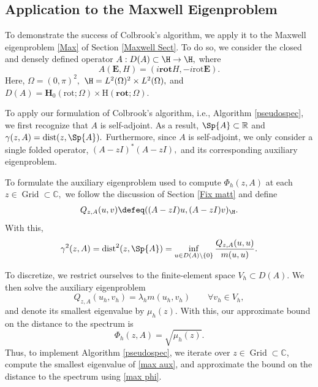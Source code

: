 \subsection{Application to the Maxwell Eigenproblem} \label{Matt Max}

To demonstrate the success of Colbrook's algorithm, we apply it to the Maxwell eigenproblem \eqref{Max} of Section \ref{Maxwell Sect}. To do so, we consider the closed and densely defined operator $A: D(A) \subset \H \rightarrow \H,$ where
\begin{equation} \label{max op}
    A(\mathbf{E}, H) = (i \textbf{rot} H, - i \text{rot} \mathbf{E}).
\end{equation}
Here, $\Omega = (0, \pi)^2,$ $\H = L^2(\Omega)^2 \times L^2(\Omega),$ and $D(A) = \mathbf{H}_0(\text{rot} ; \Omega) \times \text{H}(\textbf{rot};\Omega).$


To apply our formulation of Colbrook's algorithm, i.e., Algorithm \ref{pseudospec}, we first recognize that $A$ is self-adjoint. As a result, $\Sp{A} \subset \mathbb{R}$ and $\gamma(z, A) = \operatorname{dist}(z, \Sp{A}).$ Furthermore, since $A$ is self-adjoint, we only consider a single folded operator, $(A-zI)^*(A-zI),$ and its corresponding auxiliary eigenproblem.

To formulate the auxiliary eigenproblem used to compute $\Phi_h(z, A)$ at each $z \in \operatorname{Grid} \subset \mathbb{C},$ we follow the discussion of Section \ref{Fix matt} and define
\begin{align}
    Q_{z, A}(u, v) \defeq  ((A-zI) u, (A-zI) v)_{\H}.
\end{align}
With this, 
\begin{equation}
    \gamma^2(z, A) = \operatorname{dist}^2(z, \Sp{A}) = \inf_{u \in D(A)\setminus \{0\}} \frac{Q_{z, A}(u, u)}{m(u, u)}.
\end{equation}


To discretize, we restrict ourselves to the finite-element space $V_h \subset D(A).$ We then solve the auxiliary eigenproblem
\begin{equation} \label{max aux}
    Q_{z, A}(u_h, v_h) = \lambda_h m(u_h, v_h) \qquad \forall v_h \in V_h,
\end{equation}
and denote its smallest eigenvalue by $\mu_h(z).$
With this, our approximate bound on the distance to the spectrum is
\begin{equation} \label{max phi}
    \Phi_h(z, A) = \sqrt{\mu_h(z)}.
\end{equation}
Thus, to implement Algorithm \ref{pseudospec}, we iterate over $z \in \operatorname{Grid} \subset \mathbb{C}$, compute the smallest eigenvalue of \eqref{max aux}, and approximate the bound on the distance to the spectrum using \eqref{max phi}. 

